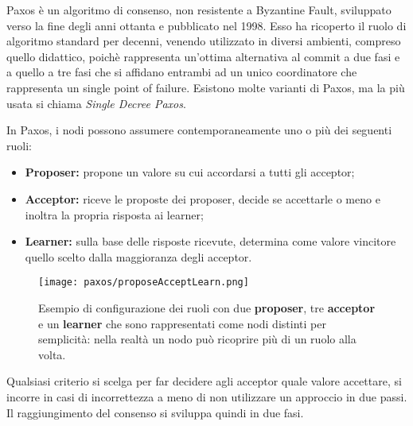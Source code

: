 Paxos è un algoritmo di consenso, non resistente a Byzantine Fault, sviluppato verso la fine degli anni ottanta e pubblicato nel 1998. Esso ha ricoperto il ruolo di algoritmo standard per decenni, venendo utilizzato in diversi ambienti, compreso quello didattico, poichè rappresenta un'ottima alternativa al commit a due fasi e a quello a tre fasi che si affidano entrambi ad un unico coordinatore che rappresenta un single point of failure. Esistono molte varianti di Paxos, ma la più usata si chiama \textit{Single Decree Paxos}.

In Paxos, i nodi possono assumere contemporaneamente uno o più dei seguenti ruoli:
\begin{itemize}
	\item \textbf{Proposer:} propone un valore su cui accordarsi a tutti gli acceptor;
	\item \textbf{Acceptor:} riceve le proposte dei proposer, decide se accettarle o meno e inoltra la propria risposta ai learner;  
	\item \textbf{Learner:} sulla base delle risposte ricevute, determina come valore vincitore quello scelto dalla maggioranza degli acceptor.
\end{itemize}


  \begin{figure}[H]
    \centering
    \texttt{[image: paxos/proposeAcceptLearn.png]}
    \caption{Esempio di configurazione dei ruoli con due \textbf{proposer}, tre \textbf{acceptor} e un \textbf{learner} che sono rappresentati come nodi distinti per semplicità: nella realtà un nodo può ricoprire più di un ruolo alla volta.}
    \label{fig:figure 5}
  \end{figure}


Qualsiasi criterio si scelga per far decidere agli acceptor quale valore accettare, si incorre in casi di incorrettezza a meno di non utilizzare un approccio in due passi. 
Il raggiungimento del consenso si sviluppa quindi in due fasi.

